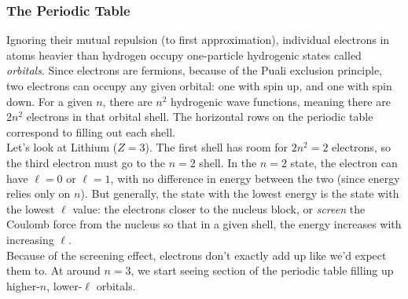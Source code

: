 \documentclass[a4paper]{article}
\begin{document}
\subsubsection{The Periodic Table}
Ignoring their mutual repulsion (to first approximation), individual electrons
in atoms heavier than hydrogen occupy one-particle hydrogenic states called
\emph{orbitals}. Since electrons are fermions, because of the Puali exclusion
principle, two electrons can occupy any given orbital: one with spin up, and
one with spin down. For a given $n$, there are $n^2$ hydrogenic wave
functions, meaning there are $2n^2$ electrons in that orbital shell.
The horizontal rows on the periodic table correspond to filling out each
shell.\\
Let's look at Lithium ($Z=3$). The first shell has room for $2n^2=2$ electrons,
so the third electron must go to the $n=2$ shell. In the $n=2$ state, the
electron can have $\ell=0$ or $\ell=1$, with no difference in energy between
the two (since energy relies only on $n$). But generally, the state with the
lowest energy is the state with the lowest $\ell$ value: the electrons closer
to the nucleus block, or \emph{screen} the Coulomb force from the nucleus
so that in a given shell, the energy increases with increasing $\ell$.\\
Because of the screening effect, electrons don't exactly add up like we'd
expect them to. At around $n=3$, we start seeing section of the periodic
table filling up higher-$n$, lower-$\ell$ orbitals.\\
\end{document}
